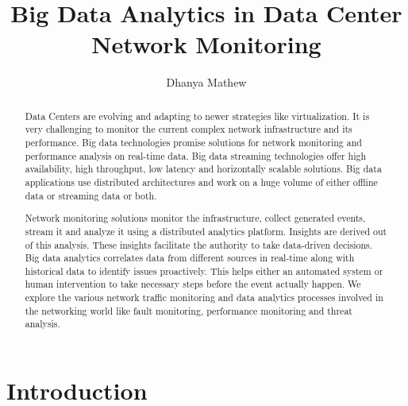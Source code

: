 \documentclass[sigconf]{acmart}
\begin{document}
\title{Big Data Analytics in Data Center Network Monitoring}


\author{Dhanya Mathew}

\renewcommand{\shortauthors}{G. v. Laszewski}


\begin{abstract}

Data Centers are evolving and adapting to newer strategies like virtualization. It is very challenging to monitor the current complex network infrastructure and its performance. Big data technologies promise solutions for network monitoring and performance analysis on real-time data. Big data streaming technologies offer high availability, high throughput, low latency and horizontally scalable solutions. Big data applications use distributed architectures and work on a huge volume of either offline data or streaming data or both. 

Network monitoring solutions monitor the infrastructure, collect generated events, stream it and analyze it using a distributed analytics platform. Insights are derived out of this analysis. These insights facilitate the authority to take data-driven decisions. Big data analytics correlates data from different sources in real-time along with historical data to identify issues proactively. This helps either an automated system or human intervention to take necessary steps before the event actually happen. We explore the various network traffic monitoring and data analytics processes involved in the networking world like fault monitoring, performance monitoring and threat analysis.

\end{abstract}



\maketitle



\section{Introduction}
\end{document}
